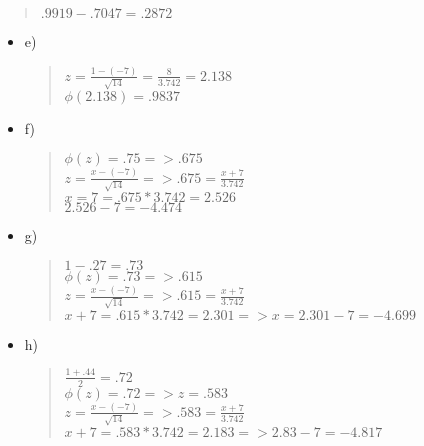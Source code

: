 \documentclass{article}
\begin{document}
\begin{enumerate}
\begin{itemize}
\begin{quote}
                $.9919-.7047 = .2872$
            \end{quote}
        \end{itemize}
        \begin{itemize}
            \item e)
            \begin{quote}
                $z = \frac{1-(-7)}{\sqrt{14}} = \frac{8}{3.742} = 2.138$ \\
                $\phi(2.138) = .9837$
            \end{quote}
        \end{itemize}
        \begin{itemize}
            \item f)
            \begin{quote}
                $\phi(z) = .75 => .675$ \\
                $z = \frac{x-(-7)}{\sqrt{14}} => .675 = \frac{x + 7}{3.742}$ \\
                $x = 7 = .675*3.742 = 2.526$ \\
                $2.526-7 = -4.474$
            \end{quote}
        \end{itemize}
        \begin{itemize}
            \item g)
            \begin{quote}
                $1-.27 = .73$ \\ 
                $\phi(z) = .73 => .615$ \\
                $z = \frac{x-(-7)}{\sqrt{14}} => .615 = \frac{x+7}{3.742}$ \\
                $x+7 = .615*3.742 = 2.301 => x = 2.301 - 7 = -4.699$
            \end{quote}
        \end{itemize}
        \begin{itemize}
            \item h)
            \begin{quote}
                $\frac{1+.44}{2} = .72$ \\
                $\phi(z) = .72 => z = .583$ \\ 
                $z = \frac{x-(-7)}{\sqrt{14}} => .583 = \frac{x+7}{3.742}$ \\
                $x + 7 = .583*3.742 = 2.183 => 2.83 - 7 = -4.817$
            \end{quote}
        \end{itemize}

\end{enumerate}
\end{document}
